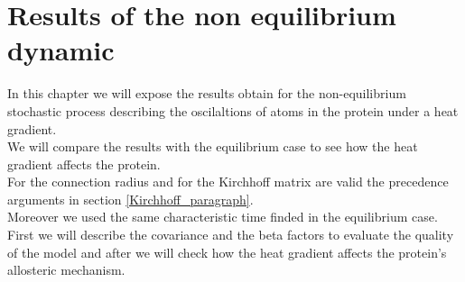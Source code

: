 \documentclass[English, Lau, oneside]{sapthesis}
\begin{document}
\newpage

\chapter{Results of the non equilibrium dynamic}
\noindent In this chapter we will expose the results obtain for the non-equilibrium stochastic process describing the oscilaltions of atoms in the protein under a heat gradient.\\
We will compare the results with the equilibrium case to see how the heat gradient affects the protein.\\
For the connection radius and for the Kirchhoff matrix are valid the precedence arguments in section \ref{Kirchhoff_paragraph}.\\
Moreover we used the same characteristic time finded in the equilibrium case.\\
First we will describe the covariance and the beta factors to evaluate the quality of the model and after we will check how the heat gradient affects the protein's allosteric mechanism.\\
\end{document}
